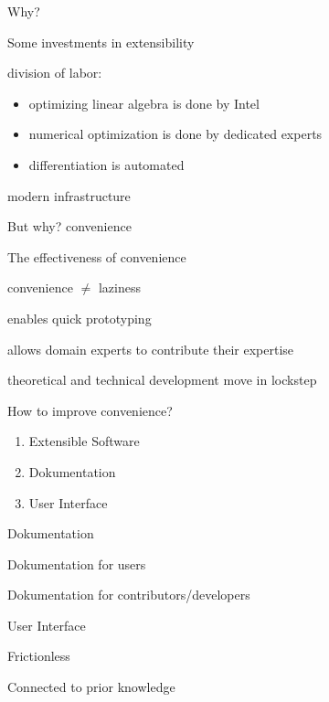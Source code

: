 \documentclass{beamer}
\newenvironment{wideitemize}{
    \itemize\addtolength{\itemsep}{15pt}\addtolength{\topsep}{10pt}}{\enditemize}
\begin{document}
    \begin{frame}{Why?}
        \begin{wideitemize}
        \item Some investments in extensibility
        \item division of labor: \begin{itemize}
            \item optimizing linear algebra is done by Intel
            \item numerical optimization is done by dedicated experts
            \item differentiation is automated
        \end{itemize}
        \item modern infrastructure
        \end{wideitemize}
    \end{frame}

    \begin{frame}{But why?}
    \centering \huge convenience
    \end{frame}

    \begin{frame}{The effectiveness of convenience}
      \begin{wideitemize}
        \item<1-> convenience $\neq$ laziness
        \item<2> enables quick prototyping
        \item<2> allows domain experts to contribute their expertise
        \item<2> theoretical and technical development move in lockstep
      \end{wideitemize}
    \end{frame}

    \begin{frame}{How to improve convenience?}
      \begin{enumerate}
        \item Extensible Software
        \item Dokumentation
        \item User Interface
      \end{enumerate}
    \end{frame}

    \begin{frame}{Dokumentation}
      \begin{wideitemize}
        \item Dokumentation for users
        \item Dokumentation for contributors/developers
      \end{wideitemize}
    \end{frame}

    \begin{frame}{User Interface}
      \begin{wideitemize}
        \item Frictionless
        \item Connected to prior knowledge
      \end{wideitemize}
    \end{frame}
\end{document}
